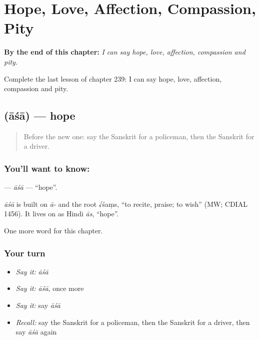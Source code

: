 
\chapter{Hope, Love, Affection, Compassion, Pity}
\label{ch:sa-hope-love-affection-compassion-pity}

\begin{chapteropening}
\textbf{By the end of this chapter:} \emph{I can say hope, love, affection, compassion and pity.}

Complete the last lesson of chapter 239: I can say hope, love, affection, compassion and pity.
\end{chapteropening}

\section[\texorpdfstring{\sk{आशा} (āśā)}{आशा (āśā)}]{ (āśā) — hope}

\label{lesson:SA-C239-asa}



\begin{quote}
Before the new one: say the Sanskrit for a policeman, then the Sanskrit for a driver.
\end{quote}

\subsection*{You'll want to know: }
\textbf{} — \emph{āśā} — \textquotedblleft{}hope\textquotedblright{}.

\begin{cousinweb}
\emph{āśā} is built on \emph{ā-} and the root √śaṃs, \textquotedblleft{}to recite, praise; to wish\textquotedblright{} (MW; CDIAL 1456). It lives on as Hindi \emph{ās}, \textquotedblleft{}hope\textquotedblright{}.
\end{cousinweb}

\begin{grammarlens}[title={What you've built}]
One more word for this chapter.
\end{grammarlens}

\subsection*{Your turn}
\begin{itemize}
\raggedright
  \item \emph{Say it:} \emph{āśā}
  \item \emph{Say it:} \emph{āśā}, once more
  \item \emph{Say it:} say \emph{āśā}
  \item \emph{Recall:} say the Sanskrit for a policeman, then the Sanskrit for a driver, then say \emph{āśā} again
\end{itemize}

